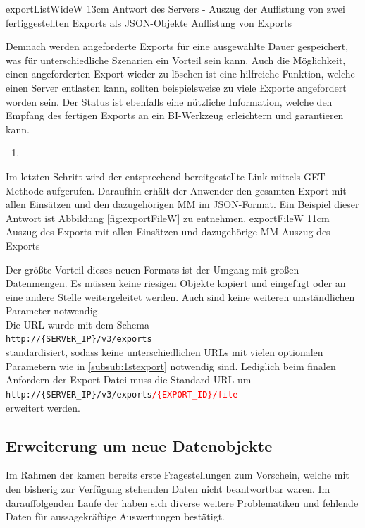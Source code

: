 \bild
{exportListWideW}
{13cm}
{Antwort des Servers - Auszug der Auflistung von zwei fertiggestellten Exports als JSON-Objekte}
{Auflistung von Exports}

Demnach werden angeforderte Exports für eine ausgewählte Dauer gespeichert, was für unterschiedliche Szenarien ein Vorteil sein kann.
Auch die Möglichkeit, einen angeforderten Export wieder zu löschen ist eine hilfreiche Funktion, welche einen Server entlasten kann, sollten beispielsweise zu viele Exporte angefordert worden sein.
Der Status ist ebenfalls eine nützliche Information, welche den Empfang des fertigen Exports an ein \gls{BI}-Werkzeug erleichtern und garantieren kann.

\begin{enumerate}[resume]
\item {}
\end{enumerate}

Im letzten Schritt wird der entsprechend bereitgestellte Link mittels GET-Methode aufgerufen.
Daraufhin erhält der Anwender den gesamten Export mit allen Einsätzen und den dazugehörigen \gls{MM} im JSON-Format. 
Ein Beispiel dieser Antwort ist Abbildung \ref{fig:exportFileW} zu entnehmen.
\bild
{exportFileW}
{11cm}
{Auszug des Exports mit allen Einsätzen und dazugehörige \gls{MM}}
{Auszug des Exports}

Der größte Vorteil dieses neuen Formats ist der Umgang mit großen Datenmengen.
Es müssen keine riesigen Objekte kopiert und eingefügt oder an eine andere Stelle weitergeleitet werden. 
Auch sind keine weiteren umständlichen Parameter notwendig. \\
Die URL wurde mit dem Schema \\
\colorbox[RGB]{240,240,240}{\texttt{http://\{SERVER\_IP\}/v3/exports}} \\
standardisiert, sodass keine unterschiedlichen URLs mit vielen optionalen Parametern wie in \ref{subsub:1stexport} notwendig sind.
Lediglich beim finalen Anfordern der Export-Datei muss die Standard-URL um \\
\colorbox[RGB]{240,240,240}{\texttt{http://\{SERVER\_IP\}/v3/exports\textcolor{red}{/\{EXPORT\_ID\}/file}}} \\
erweitert werden. 

\subsection{Erweiterung um neue Datenobjekte} %
\label{sub:erweiterung}
Im Rahmen der  kamen bereits erste Fragestellungen zum Vorschein, welche mit den bisherig zur Verfügung stehenden Daten nicht beantwortbar waren.
Im darauffolgenden Laufe der  haben sich diverse weitere Problematiken und fehlende Daten für aussagekräftige Auswertungen bestätigt.

